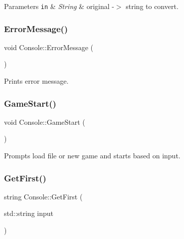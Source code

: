 \begin{DoxyParams}[1]{Parameters}
\mbox{\tt in}  & {\em String} & original -\/$>$ string to convert. \\
\hline
\end{DoxyParams}
\mbox{\label{class_console_a86dd44bc90f6f17270a54fb8859d63c4}} 
\subsubsection{\texorpdfstring{Error\+Message()}{ErrorMessage()}}
{\footnotesize\ttfamily void Console\+::\+Error\+Message (\begin{DoxyParamCaption}{ }\end{DoxyParamCaption})}



Prints error message. 

\mbox{\label{class_console_a2d9d321db0a9bf028c69e70f7aae68dd}} 
\subsubsection{\texorpdfstring{Game\+Start()}{GameStart()}}
{\footnotesize\ttfamily void Console\+::\+Game\+Start (\begin{DoxyParamCaption}{ }\end{DoxyParamCaption})}



Prompts load file or new game and starts based on input. 

\mbox{\label{class_console_a851f8712372b31495dda2af8456d24aa}} 
\subsubsection{\texorpdfstring{Get\+First()}{GetFirst()}}
{\footnotesize\ttfamily string Console\+::\+Get\+First (\begin{DoxyParamCaption}\item[{std\+::string}]{input }\end{DoxyParamCaption})}



